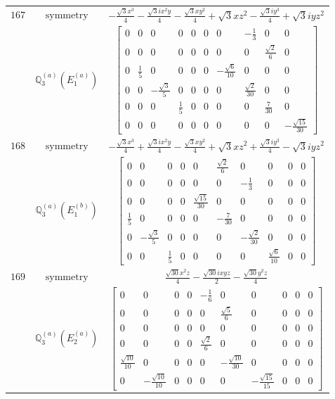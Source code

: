 \documentclass[fleqn,8pt,landscape]{jsarticle}
\begin{document}
\begin{longtable}{ccc}
$ 167 $ & $ \text{symmetry} $ & $ - \frac{\sqrt{3} x^{3}}{4} - \frac{\sqrt{3} i x^{2} y}{4} - \frac{\sqrt{3} x y^{2}}{4} + \sqrt{3} x z^{2} - \frac{\sqrt{3} i y^{3}}{4} + \sqrt{3} i y z^{2} $ \\
$  $ & $ \mathbb{Q}_{3}^{(a)}(E_{1}^{(a)}) $ & $ \begin{bmatrix} 0 & 0 & 0 & 0 & 0 & 0 & 0 & - \frac{1}{3} & 0 & 0 \\ 0 & 0 & 0 & 0 & 0 & 0 & 0 & 0 & \frac{\sqrt{2}}{6} & 0 \\ 0 & \frac{1}{5} & 0 & 0 & 0 & 0 & - \frac{\sqrt{6}}{10} & 0 & 0 & 0 \\ 0 & 0 & - \frac{\sqrt{3}}{5} & 0 & 0 & 0 & 0 & \frac{\sqrt{2}}{30} & 0 & 0 \\ 0 & 0 & 0 & \frac{1}{5} & 0 & 0 & 0 & 0 & \frac{7}{30} & 0 \\ 0 & 0 & 0 & 0 & 0 & 0 & 0 & 0 & 0 & - \frac{\sqrt{15}}{30} \end{bmatrix} $ \\ \hline
$ 168 $ & $ \text{symmetry} $ & $ - \frac{\sqrt{3} x^{3}}{4} + \frac{\sqrt{3} i x^{2} y}{4} - \frac{\sqrt{3} x y^{2}}{4} + \sqrt{3} x z^{2} + \frac{\sqrt{3} i y^{3}}{4} - \sqrt{3} i y z^{2} $ \\
$  $ & $ \mathbb{Q}_{3}^{(a)}(E_{1}^{(b)}) $ & $ \begin{bmatrix} 0 & 0 & 0 & 0 & 0 & \frac{\sqrt{2}}{6} & 0 & 0 & 0 & 0 \\ 0 & 0 & 0 & 0 & 0 & 0 & - \frac{1}{3} & 0 & 0 & 0 \\ 0 & 0 & 0 & 0 & \frac{\sqrt{15}}{30} & 0 & 0 & 0 & 0 & 0 \\ \frac{1}{5} & 0 & 0 & 0 & 0 & - \frac{7}{30} & 0 & 0 & 0 & 0 \\ 0 & - \frac{\sqrt{3}}{5} & 0 & 0 & 0 & 0 & - \frac{\sqrt{2}}{30} & 0 & 0 & 0 \\ 0 & 0 & \frac{1}{5} & 0 & 0 & 0 & 0 & \frac{\sqrt{6}}{10} & 0 & 0 \end{bmatrix} $ \\ \hline
$ 169 $ & $ \text{symmetry} $ & $ \frac{\sqrt{30} x^{2} z}{4} - \frac{\sqrt{30} i x y z}{2} - \frac{\sqrt{30} y^{2} z}{4} $ \\
$  $ & $ \mathbb{Q}_{3}^{(a)}(E_{2}^{(a)}) $ & $ \begin{bmatrix} 0 & 0 & 0 & 0 & - \frac{1}{6} & 0 & 0 & 0 & 0 & 0 \\ 0 & 0 & 0 & 0 & 0 & \frac{\sqrt{5}}{6} & 0 & 0 & 0 & 0 \\ 0 & 0 & 0 & 0 & 0 & 0 & 0 & 0 & 0 & 0 \\ 0 & 0 & 0 & 0 & \frac{\sqrt{2}}{6} & 0 & 0 & 0 & 0 & 0 \\ \frac{\sqrt{10}}{10} & 0 & 0 & 0 & 0 & - \frac{\sqrt{10}}{30} & 0 & 0 & 0 & 0 \\ 0 & - \frac{\sqrt{10}}{10} & 0 & 0 & 0 & 0 & - \frac{\sqrt{15}}{15} & 0 & 0 & 0 \end{bmatrix} $ \\ \hline

\end{longtable}
\end{document}
